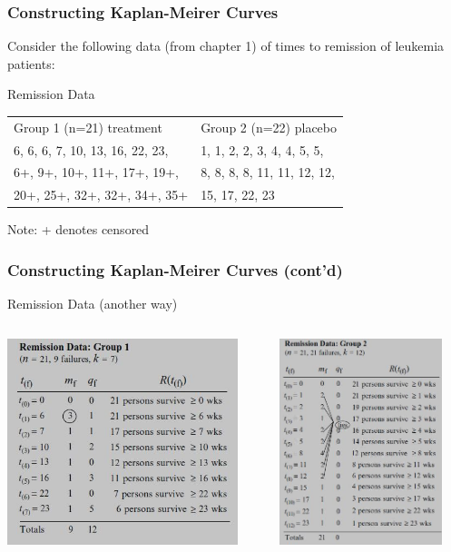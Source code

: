\documentclass{beamer}
\theoremstyle{definition}
\begin{document}
\begin{frame}
\frametitle{Constructing Kaplan-Meirer Curves}
Consider the following data (from chapter 1) of times to remission of leukemia patients:
\begin{block}{Remission Data }
\begin{table}
\begin{center}
\begin{tabular}{l l}
Group 1 (n=21) treatment & Group 2 (n=22) placebo \\
 6, 6, 6, 7, 10, 13, 16, 22, 23, & 1, 1, 2, 2, 3, 4, 4, 5, 5,  \\
 6+, 9+, 10+, 11+, 17+, 19+, & 8, 8, 8, 8, 11, 11, 12, 12, \\
   20+, 25+, 32+, 32+, 34+, 35+ & 15, 17, 22, 23
\end{tabular}
\end{center}
\end{table}
Note: + denotes censored
\end{block}
\end{frame}

\begin{frame}
\frametitle{Constructing Kaplan-Meirer Curves (cont'd)}
\begin{block}{Remission Data (another way)}
\begin{columns}
    \begin{column}{0.48\textwidth}
        \includegraphics[width =\textwidth, height=6cm]{Ch1-leuk_data_a1.JPG}
    \end{column}
    \hspace{-10pt}
    \begin{column}{0.48\textwidth}
         \includegraphics[width =\textwidth, height=6cm]{Ch1-leuk_data_b1.JPG}
    \end{column}
\end{columns}
\end{block}
\end{frame}
\end{document}
